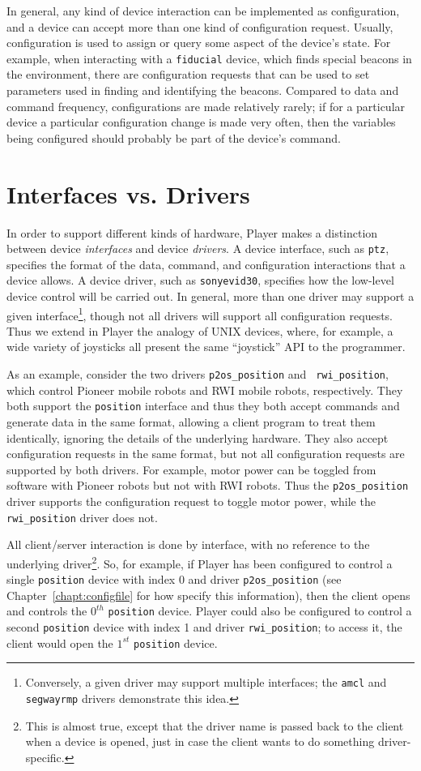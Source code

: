 \documentclass[11pt]{report}
\begin{document}
In general, any kind of device interaction can be implemented as configuration,
and a device can accept more than one kind of configuration request.  Usually,
configuration is used to assign or query some aspect of the device's state.
For example, when interacting with a {\tt fiducial} device, which finds
special beacons in the environment, there are configuration requests that
can be used to set parameters used in finding and identifying the beacons.
Compared to data and command frequency, configurations are made relatively
rarely; if for a particular device a particular configuration change is made
very often, then the variables being configured should probably be part of
the device's command.


\section{Interfaces vs. Drivers}
In order to support different kinds of hardware, Player makes a
distinction between device {\em interfaces} and device {\em drivers}.
A device interface, such as {\tt ptz}, specifies the format of the data,
command, and configuration interactions that a device allows.  A device
driver, such as {\tt sonyevid30}, specifies how the low-level device
control will be carried out.  In general, more than one driver may support
a given interface\footnote{Conversely, a given driver may support multiple
interfaces; the {\tt amcl} and {\tt segwayrmp} drivers demonstrate this
idea.}, though not all drivers will support all configuration requests.
Thus we extend in Player the analogy of UNIX devices, where, for example,
a wide variety of joysticks all present the same ``joystick'' API to
the programmer.

As an example, consider the two drivers {\tt p2os\_position} and {\tt
rwi\_position}, which control Pioneer mobile robots and RWI mobile robots,
respectively.  They both support the {\tt position} interface and thus
they both accept commands and generate data in the same format, allowing
a client program to treat them identically, ignoring the details of the
underlying hardware.  They also accept configuration requests in the same
format, but not all configuration requests are supported by both drivers.
For example, motor power can be toggled from software with Pioneer robots
but not with RWI robots.  Thus the {\tt p2os\_position} driver supports the
configuration request to toggle motor power, while the {\tt rwi\_position}
driver does not.

All client/server interaction is done by interface, with no reference
to the underlying driver\footnote{This is almost true, except that the driver
name is passed back to the client when a device is opened, just in case the 
client wants to do something driver-specific.}.  So, for example, if
Player has been configured to control a single {\tt position} device with
index 0 and driver {\tt p2os\_position} (see Chapter~\ref{chapt:configfile}
for how specify this information), then the client opens and controls the
$0^{th}$ {\tt position} device.  Player could also be configured to control
a second {\tt position} device with index 1 and driver {\tt rwi\_position};
to access it, the client would open the $1^{st}$ {\tt position} device.
\end{document}
